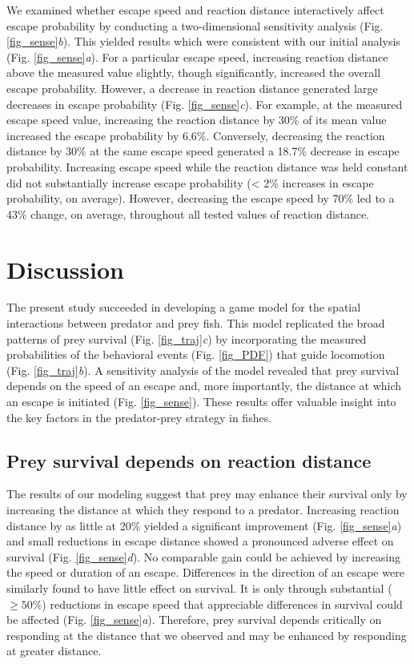 \documentclass[]{rsos}%
\begin{document}
We examined whether escape speed and reaction distance interactively affect escape probability by conducting a two-dimensional sensitivity analysis (Fig. \ref{fig_sense}\textit{b}).
This yielded results which were consistent with our initial analysis (Fig. \ref{fig_sense}\textit{a}). 
For a particular escape speed, increasing reaction distance above the measured value slightly, though significantly, increased the overall escape probability. 
However, a decrease in reaction distance generated large decreases in escape probability (Fig. \ref{fig_sense}\textit{c}). 
For example, at the measured escape speed value, increasing the reaction distance by 30\% of its mean value increased the escape probability by 6.6\%. 
Conversely, decreasing the reaction distance by 30\% at the same escape speed generated a 18.7\% decrease in escape probability.
Increasing escape speed while the reaction distance was held constant did not substantially increase escape probability (< 2\% increases in escape probability, on average).
However, decreasing the escape speed by 70\% led to a 43\% change, on average, throughout all tested values of reaction distance.



\section{Discussion} %

The present study succeeded in developing a game model for the spatial interactions between predator and prey fish. 
This model replicated the broad patterns of prey survival (Fig. \ref{fig_traj}\textit{c}) by incorporating the measured probabilities of the behavioral events (Fig. \ref{fig_PDF}) that guide locomotion (Fig. \ref{fig_traj}\textit{b}).
A sensitivity analysis of the model revealed that prey survival depends on the speed of an escape and, more importantly, the distance at which an escape is initiated (Fig. \ref{fig_sense}). 
These results offer valuable insight into the key factors in the predator-prey strategy in fishes. 

\subsection{Prey survival depends on reaction distance} 

The results of our modeling suggest that prey may enhance their survival only by increasing the distance at which they respond to a predator. 
Increasing reaction distance by as little at 20\% yielded a significant improvement (Fig. \ref{fig_sense}\textit{a}) and small reductions in escape distance showed a pronounced adverse effect on survival (Fig. \ref{fig_sense}\textit{d}).
No comparable gain could be achieved by increasing the speed or duration of an escape.
Differences in the direction of an escape were similarly found to have little effect on survival.
It is only through substantial ($\geq 50\%$) reductions in escape speed that appreciable differences in survival could be affected (Fig. \ref{fig_sense}\textit{a}).
Therefore, prey survival depends critically on responding at the distance that we observed  and may be enhanced by responding at greater distance.
\end{document}
